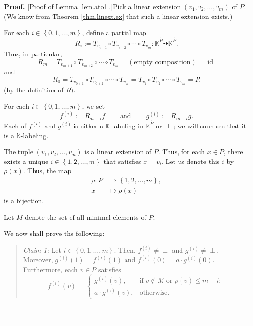 \documentclass[numbers=enddot,12pt,final,onecolumn,notitlepage]{scrartcl}%
\theoremstyle{definition}
\newenvironment{verlong}{}{}
\newenvironment{statement}{\begin{quote}}{\end{quote}}
\newcommand{\undf}{\operatorname*{\bot}}
\newenvironment{proof}[1][Proof]{\noindent\textbf{#1.} }{\ \rule{0.5em}{0.5em}}
\begin{document}
\begin{verlong}


\begin{proof}
[Proof of Lemma \ref{lem.ato1}.]Pick a linear extension $\left(  v_{1}%
,v_{2},\ldots,v_{m}\right)  $ of $P$. (We know from Theorem
\ref{thm.linext.ex} that such a linear extension exists.)

For each $i\in\left\{  0,1,\ldots,m\right\}  $, define a partial map%
\[
R_{i}:=T_{v_{i+1}}\circ T_{v_{i+2}}\circ\cdots\circ T_{v_{m}}:\mathbb{K}%
^{\widehat{P}}\dashrightarrow\mathbb{K}^{\widehat{P}}.
\]
Thus, in particular,%
\[
R_{m}=T_{v_{m+1}}\circ T_{v_{m+2}}\circ\cdots\circ T_{v_{m}}=\left(
\text{empty composition}\right)  =\operatorname*{id}%
\]
and
\[
R_{0}=T_{v_{0+1}}\circ T_{v_{0+2}}\circ\cdots\circ T_{v_{m}}=T_{v_{1}}\circ
T_{v_{2}}\circ\cdots\circ T_{v_{m}}=R
\]
(by the definition of $R$).

For each $i\in\left\{  0,1,\ldots,m\right\}  $, we set%
\[
f^{\left(  i\right)  }:=R_{m-i}f\ \ \ \ \ \ \ \ \ \ \text{and}%
\ \ \ \ \ \ \ \ \ \ g^{\left(  i\right)  }:=R_{m-i}g.
\]
Each of $f^{\left(  i\right)  }$ and $g^{\left(  i\right)  }$ is either a
$\mathbb{K}$-labeling in $\mathbb{K}^{\widehat{P}}$ or $\undf$; we will soon
see that it is a $\mathbb{K}$-labeling.

The tuple $\left(  v_{1},v_{2},\ldots,v_{m}\right)  $ is a linear extension of
$P$. Thus, for each $x\in P$, there exists a unique $i\in\left\{
1,2,\ldots,m\right\}  $ that satisfies $x=v_{i}$. Let us denote this $i$ by
$\rho\left(  x\right)  $. Thus, the map%
\begin{align*}
\rho:P  &  \rightarrow\left\{  1,2,\ldots,m\right\}  ,\\
x  &  \mapsto\rho\left(  x\right)
\end{align*}
is a bijection.

Let $M$ denote the set of all minimal elements of $P$.

We now shall prove the following:

\begin{statement}
\textit{Claim 1:} Let $i\in\left\{  0,1,\ldots,m\right\}  $. Then, $f^{\left(
i\right)  }\neq\undf$ and $g^{\left(  i\right)  }\neq\undf$. Moreover,
$g^{\left(  i\right)  }\left(  1\right)  =f^{\left(  i\right)  }\left(
1\right)  $ and $f^{\left(  i\right)  }\left(  0\right)  =a\cdot g^{\left(
i\right)  }\left(  0\right)  $. Furthermore, each $v\in P$ satisfies%
\[
f^{\left(  i\right)  }\left(  v\right)  =%
\begin{cases}
g^{\left(  i\right)  }\left(  v\right)  , & \text{if }v\notin M\text{ or }%
\rho\left(  v\right)  \leq m-i;\\
a\cdot g^{\left(  i\right)  }\left(  v\right)  , & \text{otherwise.}%
\end{cases}
\]


\end{statement}
\end{proof}
\end{verlong}
\end{document}
